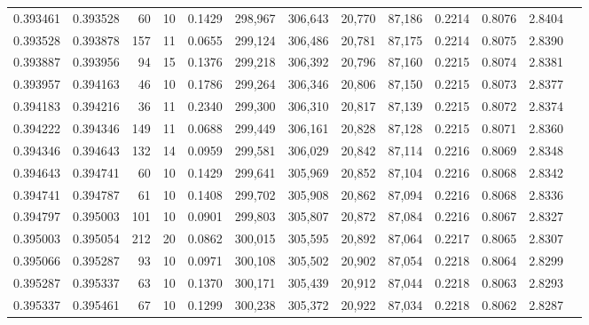 \begin{tabular}{rrrrrrrrrrrrr}
0.393461 & 0.393528 &    60 &  10 &                                     0.1429 & 298,967 & 306,643 &  20,770 &  87,186 & 0.2214 & 0.8076 & 2.8404 \\
0.393528 & 0.393878 &   157 &  11 &                                     0.0655 & 299,124 & 306,486 &  20,781 &  87,175 & 0.2214 & 0.8075 & 2.8390 \\
0.393887 & 0.393956 &    94 &  15 &                                     0.1376 & 299,218 & 306,392 &  20,796 &  87,160 & 0.2215 & 0.8074 & 2.8381 \\
0.393957 & 0.394163 &    46 &  10 &                                     0.1786 & 299,264 & 306,346 &  20,806 &  87,150 & 0.2215 & 0.8073 & 2.8377 \\
0.394183 & 0.394216 &    36 &  11 &                                     0.2340 & 299,300 & 306,310 &  20,817 &  87,139 & 0.2215 & 0.8072 & 2.8374 \\
0.394222 & 0.394346 &   149 &  11 &                                     0.0688 & 299,449 & 306,161 &  20,828 &  87,128 & 0.2215 & 0.8071 & 2.8360 \\
0.394346 & 0.394643 &   132 &  14 &                                     0.0959 & 299,581 & 306,029 &  20,842 &  87,114 & 0.2216 & 0.8069 & 2.8348 \\
0.394643 & 0.394741 &    60 &  10 &                                     0.1429 & 299,641 & 305,969 &  20,852 &  87,104 & 0.2216 & 0.8068 & 2.8342 \\
0.394741 & 0.394787 &    61 &  10 &                                     0.1408 & 299,702 & 305,908 &  20,862 &  87,094 & 0.2216 & 0.8068 & 2.8336 \\
0.394797 & 0.395003 &   101 &  10 &                                     0.0901 & 299,803 & 305,807 &  20,872 &  87,084 & 0.2216 & 0.8067 & 2.8327 \\
0.395003 & 0.395054 &   212 &  20 &                                     0.0862 & 300,015 & 305,595 &  20,892 &  87,064 & 0.2217 & 0.8065 & 2.8307 \\
0.395066 & 0.395287 &    93 &  10 &                                     0.0971 & 300,108 & 305,502 &  20,902 &  87,054 & 0.2218 & 0.8064 & 2.8299 \\
0.395287 & 0.395337 &    63 &  10 &                                     0.1370 & 300,171 & 305,439 &  20,912 &  87,044 & 0.2218 & 0.8063 & 2.8293 \\
0.395337 & 0.395461 &    67 &  10 &                                     0.1299 & 300,238 & 305,372 &  20,922 &  87,034 & 0.2218 & 0.8062 & 2.8287 \\

\end{tabular}
